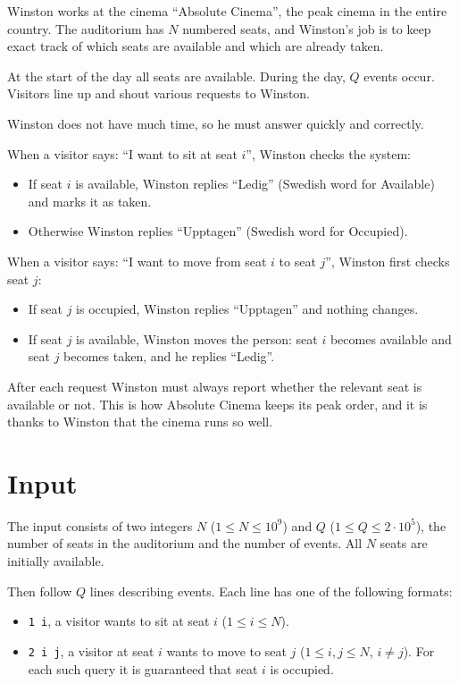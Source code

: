 

Winston works at the cinema ``Absolute Cinema'', the peak cinema in the entire country.
The auditorium has $N$ numbered seats, and Winston's job is to keep exact track of
which seats are available and which are already taken.

At the start of the day all seats are available.
During the day, $Q$ events occur. Visitors line up and shout various requests to Winston.

Winston does not have much time, so he must answer quickly and correctly.

When a visitor says: ``I want to sit at seat $i$'', Winston checks the system:
\begin{itemize}
  \item If seat $i$ is available, Winston replies ``Ledig'' (Swedish word for Available) and marks it as taken.
  \item Otherwise Winston replies ``Upptagen'' (Swedish word for Occupied).
\end{itemize}

When a visitor says: ``I want to move from seat $i$ to seat $j$'', Winston first checks seat $j$:
\begin{itemize}
  \item If seat $j$ is occupied, Winston replies ``Upptagen'' and nothing changes.
  \item If seat $j$ is available, Winston moves the person: seat $i$ becomes available and seat $j$ becomes taken, and he replies ``Ledig''.
\end{itemize}

After each request Winston must always report whether the relevant seat is available or not. This is how Absolute Cinema keeps its peak order, and it is thanks to Winston that the cinema runs so well.

\section*{Input}
The input consists of two integers $N$ ($1 \le N \le 10^{9}$) and $Q$ ($1 \le Q \le 2 \cdot 10^{5}$), the number of seats in the auditorium and the number of events. 
All $N$ seats are initially available.

Then follow $Q$ lines describing events. Each line has one of the following formats:
\begin{itemize}
  \item \texttt{1 i}, a visitor wants to sit at seat $i$ ($1 \le i \le N$).
  \item \texttt{2 i j}, a visitor at seat $i$ wants to move to seat $j$ ($1 \le i, j \le N$, $i \ne j$). For each such query it is guaranteed that seat $i$ is occupied.
\end{itemize}

